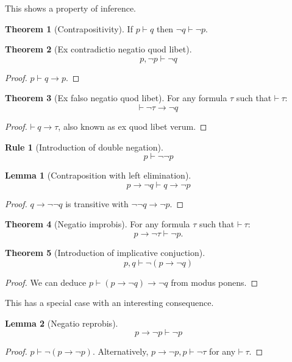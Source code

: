 \documentclass{amsbook}
\newcommand{\infers}{\mathrel\vdash}
\newcommand{\theorem}{\mathord\vdash\medspace}
\newcommand{\then}{\mathrel\rightarrow}
\theoremstyle{definition}
\newtheorem{frule}{Rule}[chapter]
\newtheorem{thm}{Theorem}[section]
\newtheorem{lmm}{Lemma}[section]
\begin{document}
This shows a property of inference.

\begin{thm}[Contrapositivity]
    If $p \infers q$ then $\neg q \infers \neg p$.
\end{thm}

\begin{thm}[Ex contradictio negatio quod libet]
    $$p, \neg p \infers \neg q$$
    \begin{proof}
        $p \infers q \then p$.
    \end{proof}
\end{thm}

\begin{thm}[Ex falso negatio quod libet]
    For any formula $\tau$ such that $\theorem \tau$:
    $$\theorem \neg\tau \then \neg q$$
    \begin{proof}
        $\theorem q \then \tau$, also known as ex quod libet verum.
    \end{proof}
\end{thm}

\begin{frule}[Introduction of double negation]
    $$p \infers \neg\neg p$$
\end{frule}

\begin{lmm}[Contraposition with left elimination]
    $$p \then \neg q \infers q \then \neg p$$
    \begin{proof}
        $q \then \neg\neg q$ is transitive with $\neg\neg q \then \neg p$.
    \end{proof}
\end{lmm}

\begin{thm}[Negatio improbis]
    For any formula $\tau$ such that $\theorem \tau$:
    $$p \then \neg \tau \infers \neg p.$$
\end{thm}

\begin{thm}[Introduction of implicative conjuction]
    $$p, q \infers \neg(p \then \neg q)$$
    \begin{proof}
        We can deduce $p \infers (p \then \neg q) \then \neg q$ from modus ponens.
    \end{proof}
\end{thm}

This has a special case with an interesting consequence.

\begin{lmm}[Negatio reprobis]
    $$p \then \neg p \infers \neg p$$
    \begin{proof}
        $p \infers \neg(p \then \neg p)$.
        Alternatively, $p \then \neg p, p \infers \neg\tau$ for any $\theorem \tau$.
    \end{proof}
\end{lmm}
\end{document}
